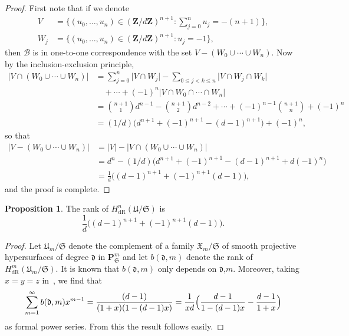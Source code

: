 \documentclass[a4paper,11pt]{article}
\numberwithin{equation}{section}
\providecommand{\abs}[1]{\lvert#1\rvert}                 %
\newcommand{\ZZ}{\mathbf{Z}} %
\providecommand{\HdR}{H_{\text{dR}}}    %
\providecommand{\cB}{\mathcal{B}} %
\theoremstyle{definition}
\newtheorem{prop}[thm]{Proposition}
\begin{document}
\begin{proof}
First note that if we denote
\begin{align*}
V   &= \{(u_0,\dotsc,u_n) \in (\ZZ/d\ZZ)^{n+1} : \sum_{j=0}^n u_j = -(n+1)\}, \\
W_j &= \{(u_0,\dotsc,u_n) \in (\ZZ/d\ZZ)^{n+1} : u_j = -1 \},
\end{align*}
then  $\cB$ is in one-to-one correspondence with the set $V-(W_0 \cup \dotsb \cup W_n)$. 
Now by the inclusion-exclusion principle, 
\begin{align*}
\abs{V \cap (W_0 \cup \dotsb \cup W_n)} 
& = \sum_{j=0}^n \abs{V \cap W_j} 
    - \sum_{0 \leq j < k \leq n} \abs{V \cap W_j \cap W_k} \\
& \quad + \dotsb + (-1)^{n} \abs{V \cap W_0 \cap \dotsb \cap W_n} \\
& = {n+1 \choose 1} d^{n-1} -{n+1 \choose 2} d^{n-2} 
    + \dotsb + (-1)^{n-1} {n+1 \choose n} + (-1)^{n} \\
& = (1/d)\bigl(d^{n+1}+(-1)^{n+1} - (d-1)^{n+1}\bigr)+(-1)^n,
\end{align*}
so that
\begin{align*}
\abs{V-(W_0 \cup \dotsb \cup W_n)}&=\abs{V}-\abs{V \cap (W_0 \cup \dotsb \cup W_n)} \\
&= d^n - (1/d)\bigl(d^{n+1}+(-1)^{n+1} - (d-1)^{n+1}+d (-1)^n \bigr) \\
&= \frac{1}{d} \bigl((d-1)^{n+1} + (-1)^{n+1}(d-1) \bigr),
\end{align*}
and the proof is complete.
\end{proof}

\begin{prop} \label{prop:rankcoho}
The rank of $\HdR^n(\mathfrak{U}/\mathfrak{S})$ is
\[
\frac{1}{d} \bigl((d-1)^{n+1} + (-1)^{n+1}(d-1) \bigr).
\]
\end{prop}

\begin{proof}
Let $\mathfrak{U}_m/\mathfrak{S}$ denote the complement of a family
$\mathfrak{X}_m/\mathfrak{S}$ of smooth projective hypersurfaces of 
degree $\mathfrak{d}$ in 
$\mathbf{P}^m_{\mathfrak{S}}$ and let $b(\mathfrak{d},m)$ denote the rank 
of $\HdR^m(\mathfrak{U}_m/\mathfrak{S})$. It is known that 
$b(\mathfrak{d},m)$ only depends on $\mathfrak{d}$,$m$. Moreover, 
taking $x=y=z$ in~\citep[Corollaire 2.4 (i)]{sga7}, we find that
\[
\sum_{m=1}^{\infty} b(\mathfrak{d},m) x^{m-1} = \frac{(d-1)}{(1+x)(1-(d-1)x)} = \frac{1}{xd} \Bigl( \frac{d-1}{1-(d-1)x} - \frac{d-1}{1+x} \Bigr)
\]
as formal power series. From this the result follows easily. 
\end{proof}
\end{document}
